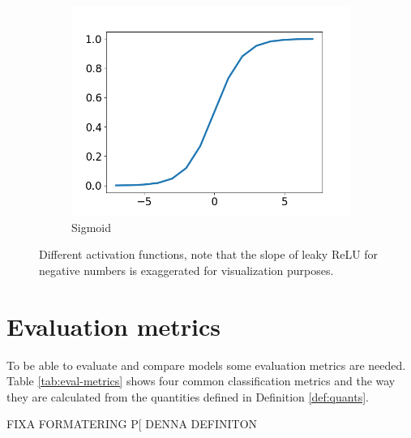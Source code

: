 \begin{figure}
\begin{subfigure}[t]{0.3\textwidth}
    \includegraphics[width=\textwidth]{files/figs/backg/sigmoid.png}
    \caption{Sigmoid}
    \label{fig:sigmoid}
  \end{subfigure}
  \caption{Different activation functions, note that the slope of leaky ReLU for negative numbers is exaggerated for visualization purposes. }
  \label{fig:activations}
\end{figure}


\section{Evaluation metrics}
To be able to evaluate and compare models some evaluation metrics are needed. Table \ref{tab:eval-metrics} shows four common classification metrics and the way they are calculated from the quantities defined in Definition \ref{def:quants}.


FIXA FORMATERING P[ DENNA DEFINITON
\begin{definition}
   \\
   \\
   \\
  \label{def:quants}
\end{definition}

